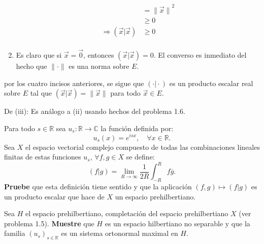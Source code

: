 \documentclass[12pt]{report}
\newcounter{it}
\theoremstyle{largebreak}
\newcommand\cf[3]{\ensuremath{#1:#2\rightarrow#3}}
\newcommand\pint[2]{\ensuremath{\left(#1\big|#2\right)}}
\newcommand\conj[1]{\ensuremath{\overline{#1}}}
\newcommand\norm[1]{\ensuremath{\|#1\|}}
\begin{document}
\begin{sol}
\begin{enumerate}
\begin{equation*}
\begin{split}
                    &=\norm{\vec{x}}^2\\
                    &\geq0\\
                    \Rightarrow \pint{\vec{x}}{\vec{x}}&\geq 0\\
                \end{split}
            \end{equation*}
            \item Es claro que si $\vec{x}=\vec{0}$, entonces $\pint{\vec{x}}{\vec{x}}=0$. El converso es inmediato del hecho que $\norm{\cdot}$ es una norma sobre $E$.
        \end{enumerate}
        por los cuatro incisos anteriores, se sigue que $\pint{\cdot}{\cdot}$ es un producto escalar real sobre $E$ tal que $\pint{\vec{x}}{\vec{x}}=\norm{\vec{x}}$ para todo $\vec{x}\in E$.

        De (iii): Es análogo a (ii) usando hechos del problema 1.6.
    \end{sol}

    \begin{excer}
        Para todo $s\in\mathbb{R}$ sea $\cf{u_s}{\mathbb{R}}{\mathbb{C}}$ la función definida por:
        \begin{equation*}
            u_s(x)=e^{isx},\quad\forall x\in\mathbb{R}.
        \end{equation*}
        Sea $X$ el espacio vectorial complejo compuesto de todas las combinaciones lineales finitas de estas funciones $u_s$, $\forall f,g\in X$ se define:
        \begin{equation*}
            \pint{f}{g}=\lim_{R\rightarrow\infty}\frac{1}{2R}\int_{-R}^Rf\conj{g}.
        \end{equation*}
        \textbf{Pruebe} que esta definición tiene sentido y que la aplicación $(f,g)\mapsto\pint{f}{g}$ es un producto escalar que hace de $X$ un espacio prehilbertiano.

        Sea $H$ el espacio prehilbertiano, completación del espacio prehilbertiano $X$ (ver problema 1.5). \textbf{Muestre} que $H$ es un espacio hilbertiano no separable y que la familia $\left(u_s\right)_{s\in\mathbb{R}}$ es un sistema ortonormal maximal en $H$.
    \end{excer}
\end{document}
